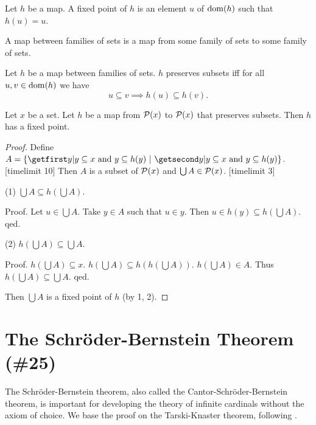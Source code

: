 \documentclass{article}
\begin{document}
 \begin{forthel}
    \begin{definition}
      Let $h$ be a map.
      A fixed point of $h$ is an element $u$ of $\operatorname{dom}(h)$ such that $h(u) = u$.
    \end{definition}

    \begin{definition}
      A map between families of sets is a map from some family of
sets to some
      family of sets.
    \end{definition}

    \begin{definition*}
Let $h$ be a map between families of sets.
      $h$ preserves subsets iff for all $u, v \in \operatorname{dom}(h)$
      we have \[ u \subseteq v \implies h(u) \subseteq h(v). \]
    \end{definition*}


    \begin{theorem*}[title=Knaster-Tarski,id=KT]
      Let $x$ be a set.
      Let $h$ be a map from ${\cal P}(x)$ to ${\cal P}(x)$ that preserves subsets.
      Then $h$ has a fixed point.
    \end{theorem*}
    \begin{proof}
      Define $A = \class{y | \text{$y \subseteq x$ and
      $y \subseteq h(y)$}}$.
[timelimit 10]
      Then $A$ is a subset of ${\cal P}(x)$ and
      $\bigcup A \in {\cal P}(x)$.
[timelimit 3]

(1) $\bigcup A \subseteq h(\bigcup A)$.

Proof.        Let $u \in \bigcup A$.
        Take $y \in A$ such that $u \in y$.
        Then $u \in h(y) \subseteq h(\bigcup A)$.
      qed.

(2) $h(\bigcup A) \subseteq \bigcup A$.

Proof.      $h(\bigcup A) \subseteq x$.
$h(\bigcup A) \subseteq h(h(\bigcup A))$.
$h(\bigcup A) \in A$.
Thus $h(\bigcup A) \subseteq \bigcup A$.
qed.

Then $\bigcup A$ is a fixed point of $h$ (by 1, 2).
    \end{proof}

\end{forthel}

\section{The Schröder-Bernstein Theorem (\#25)}

The Schröder-Bernstein theorem, also called the
Cantor-Schröder-Bernstein theorem, is important for developing
the theory of infinite cardinals without the axiom of choice.
We base the proof on the Tarski-Knaster theorem, following
 \cite{Schroeder2012}.
\end{document}
